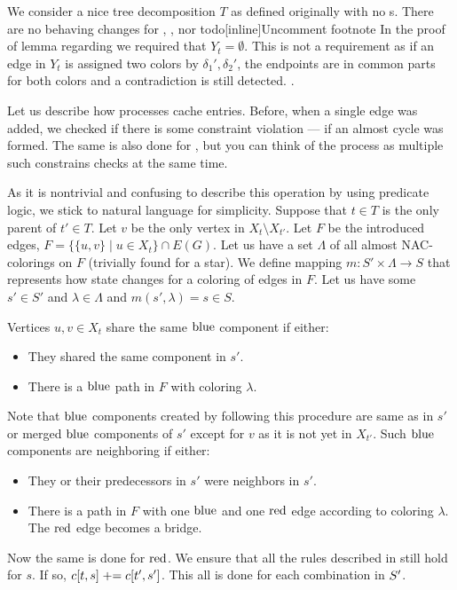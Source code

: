 We consider a nice tree decomposition \( T \) as defined originally
with no \IntroduceEdgeNode{}s.
There are no behaving changes for
\LeafNode{}, \RootNode{}, \ForgetVertexNode{} nor \JoinNode{}
todo[inline]{Uncomment footnote}{
In the proof of lemma 
regarding \JoinNode{} we required that \( Y_t = \emptyset \).
This is not a requirement as if an edge in \( Y_t \) is assigned two colors
by \( \delta_1', \delta_2' \), the endpoints are in common parts for both colors
and a contradiction is still detected.
}.

Let us describe how \IntroduceVertexWithEdgesNode{} processes cache entries.
Before, when a single edge was added,
we checked if there is some constraint violation
--- if an almost cycle was formed.
The same is also done for \IntroduceVertexWithEdgesNode{},
but you can think of the process as
multiple such constrains checks at the same time.

As it is nontrivial and confusing to describe this operation
by using predicate logic, we stick to natural language for simplicity.
Suppose that \( t \in T \) is
the only parent of \( t' \in T \).
Let \( v \) be the only vertex in \( X_t \setminus X_{t'} \).
Let \( F \) be the introduced edges,
\( F = \{ \{ u, v \} \mid u \in X_t \} \cap E(G) \).
%
Let us have a set \( \Lambda \) of all almost NAC-colorings on \( F \)
(trivially found for a star).
We define mapping \( m: S' \times \Lambda \to S \)
that represents how state changes for a coloring of edges in \( F \).
Let us have some \( s' \in S' \) and \( \lambda \in \Lambda \)
and \( m(s', \lambda) = s \in S \).

Vertices \( u, v \in X_t \) share the same \( \text{blue} \) component if either:
%
\begin{itemize}
	\item They shared the same component in \( s' \).
	\item There is a \( \text{blue} \) path in \( F \) with coloring \( \lambda \).
\end{itemize}
%
Note that \( \text{blue} \) components created by following this procedure
are same as in \( s' \) or merged \( \text{blue} \) components of \( s' \)
except for \( v \) as it is not yet in \( X_{t'} \).
Such \( \text{blue} \) components are neighboring if either:
%
\begin{itemize}
	\item They or their predecessors in \( s' \)
	      were neighbors in \( s' \).
	\item There is a path in \( F \) with
	      one \( \text{blue} \) and one \( \text{red} \) edge
	      according to coloring \( \lambda \).
	      The \( \text{red} \) edge becomes a bridge.
\end{itemize}
%
Now the same is done for \( \text{red} \).
We ensure that all the rules described in \IntroduceEdgeNode{}
still hold for \( s \). If so, \( c[t, s] \mathrel{+}= c[t', s'] \).
This all is done for each combination in \( S' \time \Lambda \).

